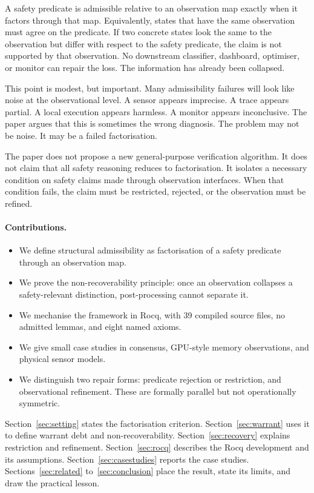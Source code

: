 \documentclass[a4paper,11pt]{article}
\begin{document}
A safety predicate is admissible relative to an observation map exactly when it
factors through that map. Equivalently, states that have the same observation
must agree on the predicate. If two concrete states look the same to the
observation but differ with respect to the safety predicate, the claim is not
supported by that observation. No downstream classifier, dashboard, optimiser,
or monitor can repair the loss. The information has already been collapsed.

This point is modest, but important. Many admissibility failures will look like
noise at the observational level. A sensor appears imprecise. A trace appears
partial. A local execution appears harmless. A monitor appears inconclusive. The
paper argues that this is sometimes the wrong diagnosis. The problem may not be
noise. It may be a failed factorisation.

The paper does not propose a new general-purpose verification algorithm. It
does not claim that all safety reasoning reduces to factorisation. It isolates a
necessary condition on safety claims made through observation interfaces. When
that condition fails, the claim must be restricted, rejected, or the observation
must be refined.

\paragraph{Contributions.}

\begin{itemize}
\item We define structural admissibility as factorisation of a safety predicate
through an observation map.
\item We prove the non-recoverability principle: once an observation collapses a
safety-relevant distinction, post-processing cannot separate it.
\item We mechanise the framework in Rocq, with 39 compiled source files, no
admitted lemmas, and eight named axioms.
\item We give small case studies in consensus, GPU-style memory observations,
and physical sensor models.
\item We distinguish two repair forms: predicate rejection or restriction, and
observational refinement. These are formally parallel but not operationally
symmetric.
\end{itemize}

Section~\ref{sec:setting} states the factorisation criterion. Section~\ref{sec:warrant}
uses it to define warrant debt and non-recoverability. Section~\ref{sec:recovery}
explains restriction and refinement. Section~\ref{sec:rocq} describes the Rocq
development and its assumptions. Section~\ref{sec:casestudies} reports the case
studies. Sections~\ref{sec:related} to~\ref{sec:conclusion} place the result,
state its limits, and draw the practical lesson.
\end{document}
